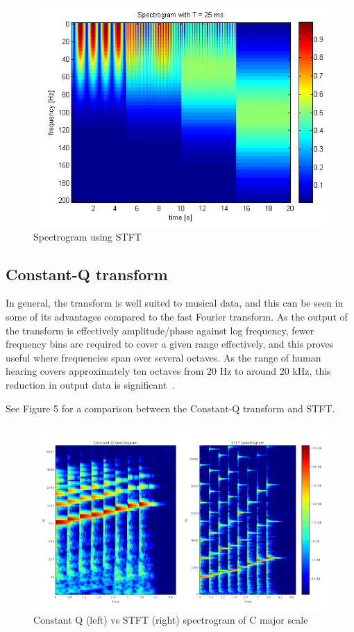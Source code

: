 \begin{figure}[h]
	\caption[Spectrogram using Short-Term Fourier Transform]{ Spectrogram using STFT~\cite{stft_fig}}
	\centering
	\includegraphics[width=1\textwidth, height=\textheight, keepaspectratio]{"resources/STFT_spectrogram"}
\end{figure}


\subsection{Constant-Q transform}
In general, the transform is well suited to musical data, and this can be seen in some of its advantages compared to the fast Fourier transform. As the output of the transform is effectively amplitude/phase against log frequency, fewer frequency bins are required to cover a given range effectively, and this proves useful where frequencies span over several octaves. As the range of human hearing covers approximately ten octaves from 20 Hz to around 20 kHz, this reduction in output data is significant~\cite{constant_q}. \par
 See Figure 5 for a comparison between the Constant-Q transform and STFT.


\begin{figure}[h]
	\caption[Constant Q vs STFT spectrogram of C major scale]{ Constant Q (left) vs STFT (right) spectrogram of C major scale}
	\centering
	\label{fig:cq_vs_stft}
	\includegraphics[width=1\textwidth, height=\textheight, keepaspectratio]{"resources/Q_vs_STFT"}
\end{figure}